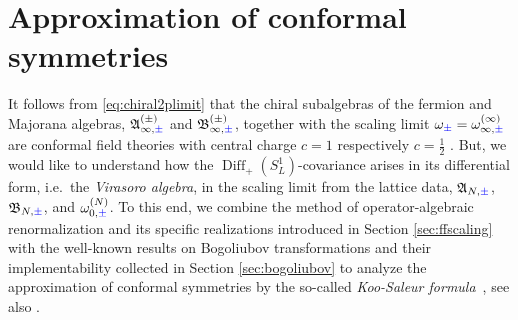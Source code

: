 \documentclass[a4paper, 11pt]{article}
\newcommand{\fA}{\mathfrak{A}}\newcommand{\cA}{\mathcal{A}}\newcommand{\dA}{\mathds{A}}\newcommand{\sA}{\mathscr{A}}
\newcommand{\fB}{\mathfrak{B}}\newcommand{\cB}{\mathcal{B}}\newcommand{\dB}{\mathds{B}}\newcommand{\sB}{\mathscr{B}}
\DeclareMathOperator{\1}{\mathds{1}}
\DeclareMathOperator{\Diff}{Diff}
\begin{document}
\section{Approximation of conformal symmetries}
\label{sec:approxconf}
It follows from \eqref{eq:chiral2plimit} that the chiral subalgebras of the fermion and Majorana algebras, $\fA^{(\pm)}_{\infty,{\color{blue}\pm}}$ and $\fB^{(\pm)}_{\infty,{\color{blue}\pm}}$, together with the scaling limit $\omega_{{\color{blue}\pm}} = \omega^{(\infty)}_{\infty,{\color{blue}\pm}}$ are conformal field theories with central charge $c=1$ respectively $c=\tfrac{1}{2}$ \cite{DiFrancescoCFTBook, EvansQuantumSymmetriesOn}. But, we would like to understand how the $\Diff_{+}(S^{1}_{L})$-covariance arises in its differential form, i.e.~the \textit{Virasoro algebra}, in the scaling limit from the lattice data, $\fA_{N,{\color{blue}\pm}}$, $\fB_{N,{\color{blue}\pm}}$, and $\omega^{(N)}_{0,{\color{blue}\pm}}$.
To this end, we combine the method of operator-algebraic renormalization and its specific realizations introduced in Section \ref{sec:ffscaling} with the well-known results on Bogoliubov transformations and their implementability collected in Section \ref{sec:bogoliubov} to analyze the approximation of conformal symmetries by the so-called \textit{Koo-Saleur formula} \cite{KooRepresentationsOfThe}, see also  \cite{MilstedExtractionOfConformal, ZiniConformalFieldTheories}. 
\end{document}
